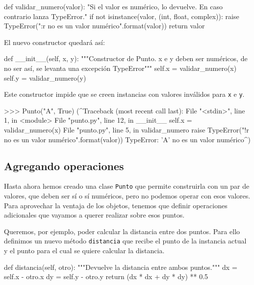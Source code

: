 \begin{codigo-python-sn}
def validar_numero(valor):
    "Si el valor es numérico, lo devuelve. En caso contrario lanza TypeError."
    if not isinstance(valor, (int, float, complex)):
        raise TypeError("{:r} no es un valor numérico".format(valor))
    return valor
\end{codigo-python-sn}

El nuevo constructor quedará así:

\begin{codigo-python-sn}
    def __init__(self, x, y):
        """Constructor de Punto. x e y deben ser numéricos,
           de no ser así, se levanta una excepción TypeError"""
        self.x = validar_numero(x)
        self.y = validar_numero(y)
\end{codigo-python-sn}

Este constructor impide que se creen instancias con valores inválidos para
\lstinline!x! e \lstinline!y!.

\begin{codigo-python-sn}
>>> Punto("A", True)
(^Traceback (most recent call last):
  File "<stdin>", line 1, in <module>
  File "punto.py", line 12, in __init__
    self.x = validar_numero(x)
  File "punto.py", line 5, in validar_numero
    raise TypeError("{!r} no es un valor numérico".format(valor))
TypeError: 'A' no es un valor numérico^)
\end{codigo-python-sn}

\subsection{Agregando operaciones}

Hasta ahora hemos creado una clase \lstinline!Punto! que permite
construirla con un par de valores, que deben ser sí o sí numéricos, pero no
podemos operar con esos valores.  Para aprovechar la ventaja de los objetos,
tenemos que definir operaciones adicionales que vayamos a querer realizar
sobre esos puntos.

Queremos, por ejemplo, poder calcular la distancia entre dos puntos.  Para
ello definimos un nuevo método \lstinline!distancia! que recibe el punto de
la instancia actual y el punto para el cual se quiere calcular la
distancia.

\begin{codigo-python-sn}
    def distancia(self, otro):
        """Devuelve la distancia entre ambos puntos."""
        dx = self.x - otro.x
        dy = self.y - otro.y
        return (dx * dx + dy * dy) ** 0.5
\end{codigo-python-sn}

